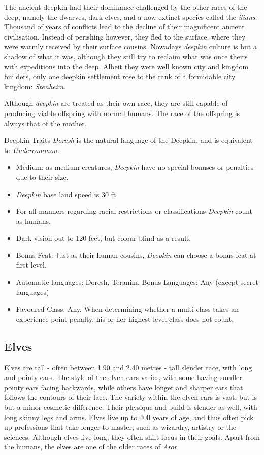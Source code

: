 The ancient deepkin had their dominance challenged by the other races
of the deep, namely the dwarves, dark elves, and a now extinct species called
the \emph{ilians}. Thousand of years of conflicts lead to the decline of their
magnificent ancient civilisation. Instead of perishing however, they fled to
the surface, where they were warmly received by their surface cousins. Nowadays
\emph{deepkin} culture is but a shadow of what it was, although they still try
to reclaim what was once theirs with expeditions into the deep.  Albeit they
were well known city and kingdom builders, only one deepkin settlement rose to
the rank of a formidable city kingdom: \emph{Stenheim}.

Although \emph{deepkin} are treated as their own race, they are still capable
of producing viable offspring with normal humans. The race of the offspring is
always that of the mother.

\begin{35e}{Deepkin Traits}
  \emph{Doresh} is the natural language of the Deepkin, and is equivalent to
  \emph{Undercommon}.

  \begin{itemize}[noitemsep]
    \item Medium: as medium creatures, \emph{Deepkin} have no special bonuses or
    penalties due to their size.
    \item \emph{Deepkin} base land speed is 30 ft.
    \item For all manners regarding racial restrictions or classifications
    \emph{Deepkin} count as humans.
    \item Dark vision out to 120 feet, but colour blind as a result.
    \item Bonus Feat: Just as their human cousins, \emph{Deepkin} can choose a
    bonus feat at first level.
    \item Automatic languages: Doresh, Teranim. Bonus Languages: Any (except
      secret languages)
    \item Favoured Class: Any. When determining whether a multi class takes an
    experience point penalty, his or her highest-level class does not count.
  \end{itemize}
\end{35e}

\subsection{Elves}
\label{sec:Elves}

Elves are tall - often between 1.90 and 2.40 metres - tall slender race, with
long and pointy ears. The style of the elven ears varies, with some having
smaller pointy ears facing backwards, while others have longer and sharper
ears that follows the contours of their face. The variety within the elven
ears is vast, but is but a minor cosmetic difference. Their physique and build
is slender as well, with long skinny legs and arms. Elves live up to 400 years
of age, and thus often pick up professions that take longer to master, such as
wizardry, artistry or the sciences. Although elves live long, they often shift
focus in their goals. Apart from the humans, the elves are one of the older
races of \emph{Aror}.

